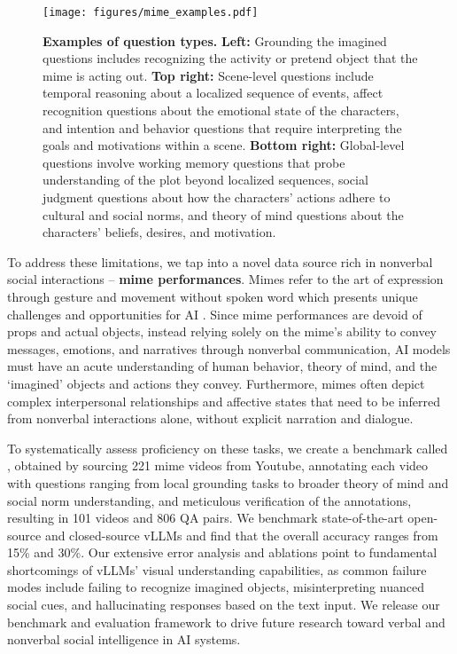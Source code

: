 \begin{figure*}
    \centering
    \vspace{-4mm}
    \texttt{[image: figures/mime\_examples.pdf]}
    \vspace{-1mm}
    \caption{\textbf{Examples of {\data} question types.} \textbf{Left:} Grounding the imagined questions includes recognizing the activity or pretend object that the mime is acting out. \textbf{Top right:} Scene-level questions include temporal reasoning about a localized sequence of events, affect recognition questions about the emotional state of the characters, and intention and behavior questions that require interpreting the goals and motivations within a scene. \textbf{Bottom right:} Global-level questions involve working memory questions that probe understanding of the plot beyond localized sequences, social judgment questions about how the characters' actions adhere to cultural and social norms, and theory of mind questions about the characters' beliefs, desires, and motivation.}
    \vspace{-2mm}
    \label{fig:question_examples}
\end{figure*}

To address these limitations, we tap into a novel data source rich in nonverbal social interactions -- \textbf{mime performances}. Mimes refer to the art of expression through gesture and movement without spoken word \cite{zywiczynski2018defining} which presents unique challenges and opportunities for AI \cite{phutela2015importance}. Since mime performances are devoid of props and actual objects, instead relying solely on the mime's ability to convey messages, emotions, and narratives through nonverbal communication, AI models must have an acute understanding of human behavior, theory of mind, and the `imagined' objects and actions they convey. 
Furthermore, mimes often depict complex interpersonal relationships and affective states that need to be inferred from nonverbal interactions alone, without explicit narration and dialogue.


To systematically assess proficiency on these tasks, we create a benchmark called \data, obtained by sourcing 221 mime videos from Youtube, annotating each video with questions ranging from local grounding tasks to broader theory of mind and social norm understanding, and meticulous verification of the annotations, resulting in 101 videos and 806 QA pairs. We benchmark state-of-the-art open-source and closed-source vLLMs and find that the overall accuracy ranges from 15\% and 30\%. Our extensive error analysis and ablations point to fundamental shortcomings of vLLMs' visual understanding capabilities, as common failure modes include failing to recognize imagined objects, misinterpreting nuanced social cues, and hallucinating responses based on the text input. We release our benchmark and evaluation framework to drive future research toward verbal and nonverbal social intelligence in AI systems.
